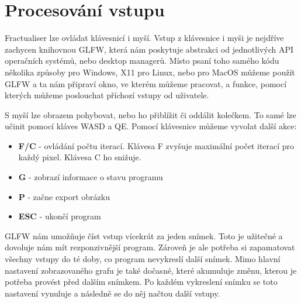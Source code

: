 \section{Procesování vstupu}
Fractualiser lze ovládat klávesnicí i myší. Vstup z klávesnice i myši je
nejdříve zachycen knihovnou GLFW, která nám poskytuje abstrakci od jednotlivých
API operačních systémů, nebo desktop managerů. Místo psaní toho samého kódu
několika způsoby pro Windows, X11 pro Linux, nebo pro MacOS můžeme použít GLFW
a ta nám připraví okno, ve kterém můžeme pracovat, a funkce, pomocí kterých
můžeme poslouchat příchozí vstupy od uživatele.

S myší lze obrazem pohybovat, nebo ho přiblížit či oddálit kolečkem. To samé
lze učinit pomocí kláves WASD a QE. Pomocí klávesnice můžeme vyvolat další
akce:
\begin{itemize}
    \item{\textbf{F/C} - ovládání počtu iterací. Klávesa F zvyšuje 
        maximální počet iterací pro každý pixel. Klávesa C ho snižuje.}
    \item{\textbf{G} - zobrazí informace o stavu programu}
    \item{\textbf{P} - začne export obrázku}
    \item{\textbf{ESC} - ukončí program}
\end{itemize}

GLFW nám umožňuje číst vstup vícekrát za jeden snímek. Toto je užitečné a
dovoluje nám mít rezponzivnější program. Zároveň je ale potřeba si zapamatovat
všechny vstupy do té doby, co program nevykreslí další snímek. Mimo hlavní
nastavení zobrazovaného grafu je také dočasné, které akumuluje změnu, kterou je
potřeba provést před dalším snímkem. Po každém vykreslení snímku se toto
nastavení vynuluje a následně se do něj načtou další vstupy.

\vfill\eject
